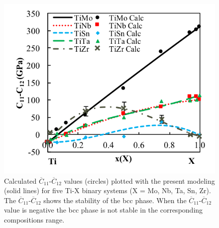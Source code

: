 \pagebreak
\begin{figure}[H]
	\centering
	\includegraphics{Chapter-5/Figures/tixc11-c12.png}
	\caption{Calculated $\overline{C}_{11}$-$\overline{C}_{12}$ values (circles) plotted with the present modeling (solid lines) for five Ti-X binary systems (X = Mo, Nb, Ta, Sn, Zr). The $\overline{C}_{11}$-$\overline{C}_{12}$ shows the stability of the bcc phase. When the $\overline{C}_{11}$-$\overline{C}_{12}$ value is negative the bcc phase is not stable in the corresponding compositions range.}
	\label{Ch5-figure:tixc11-c12}
\end{figure}

